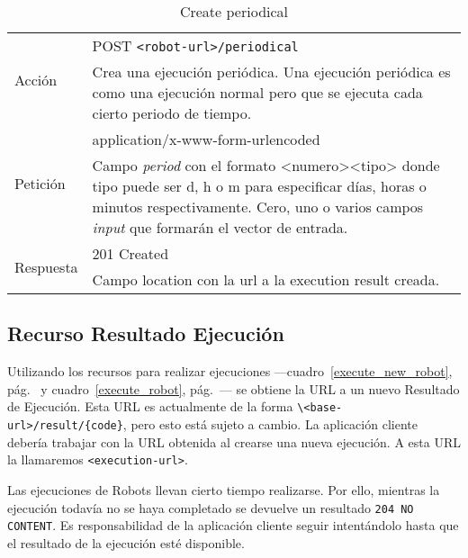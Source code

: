 \begin{table}
\begin{tabularx}{\textwidth}{l X}
\multirow{2}{*}{Acción}
 & POST \verb+<robot-url>/periodical+ \\
 & Crea una ejecución periódica. Una ejecución periódica es como una
ejecución normal pero que se ejecuta cada cierto periodo de tiempo.\\ \hline
\multirow{2}{*}{Petición}
 & application/x-www-form-urlencoded \\
 & Campo \emph{period} con el formato <numero><tipo> donde tipo puede
ser d, h o m para especificar días, horas o minutos respectivamente.\newline
 Cero, uno o varios campos \emph{input} que formarán el vector de entrada.\\ \hline
\multirow{2}{*}{Respuesta}
& 201 Created \\
& Campo location con la url a la execution result creada.\\ \hline
\end{tabularx}
\caption{Create periodical}
\label{create_periodical}
\end{table}
\newpage

\subsection{Recurso Resultado Ejecución}

Utilizando los recursos para realizar ejecuciones
---cuadro~\ref{execute_new_robot}, pág.~\pageref{execute_new_robot} y
cuadro~\ref{execute_robot}, pág.~\pageref{execute_robot}--- se obtiene
la URL a un nuevo Resultado de Ejecución. Esta URL es actualmente de
la forma \verb+\<base-url>/result/{code}+, pero esto está sujeto a
cambio. La aplicación cliente debería trabajar con la URL obtenida al
crearse una nueva ejecución. A esta URL la llamaremos
\verb+<execution-url>+.

Las ejecuciones de Robots llevan cierto tiempo realizarse. Por ello,
mientras la ejecución todavía no se haya completado se devuelve un
resultado \verb+204 NO CONTENT+. Es responsabilidad de la aplicación
cliente seguir intentándolo hasta que el resultado de la ejecución
esté disponible.

